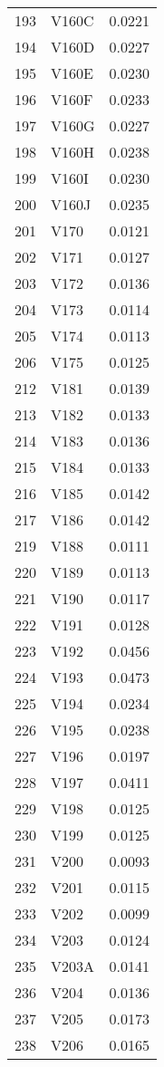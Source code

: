 \documentclass{amsart}
\begin{document}
\begin{longtable}{rlr}
  193 & V160C & 0.0221 \\ 
  194 & V160D & 0.0227 \\ 
  195 & V160E & 0.0230 \\ 
  196 & V160F & 0.0233 \\ 
  197 & V160G & 0.0227 \\ 
  198 & V160H & 0.0238 \\ 
  199 & V160I & 0.0230 \\ 
  200 & V160J & 0.0235 \\ 
  201 & V170 & 0.0121 \\ 
  202 & V171 & 0.0127 \\ 
  203 & V172 & 0.0136 \\ 
  204 & V173 & 0.0114 \\ 
  205 & V174 & 0.0113 \\ 
  206 & V175 & 0.0125 \\ 
  212 & V181 & 0.0139 \\ 
  213 & V182 & 0.0133 \\ 
  214 & V183 & 0.0136 \\ 
  215 & V184 & 0.0133 \\ 
  216 & V185 & 0.0142 \\ 
  217 & V186 & 0.0142 \\ 
  219 & V188 & 0.0111 \\ 
  220 & V189 & 0.0113 \\ 
  221 & V190 & 0.0117 \\ 
  222 & V191 & 0.0128 \\ 
  223 & V192 & 0.0456 \\ 
  224 & V193 & 0.0473 \\ 
  225 & V194 & 0.0234 \\ 
  226 & V195 & 0.0238 \\ 
  227 & V196 & 0.0197 \\ 
  228 & V197 & 0.0411 \\ 
  229 & V198 & 0.0125 \\ 
  230 & V199 & 0.0125 \\ 
  231 & V200 & 0.0093 \\ 
  232 & V201 & 0.0115 \\ 
  233 & V202 & 0.0099 \\ 
  234 & V203 & 0.0124 \\ 
  235 & V203A & 0.0141 \\ 
  236 & V204 & 0.0136 \\ 
  237 & V205 & 0.0173 \\ 
  238 & V206 & 0.0165 \\ 

\end{longtable}
\end{document}
